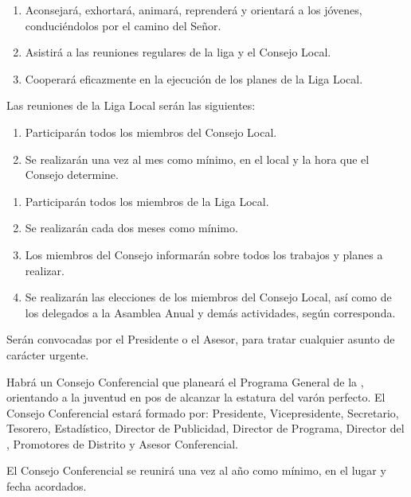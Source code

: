\begin{enumerate}
    \item Aconsejará, exhortará, animará, reprenderá y orientará a los jóvenes, conduciéndolos por el camino del Señor.
    \item Asistirá a las reuniones regulares de la liga y el Consejo Local.
    \item Cooperará eficazmente en la ejecución de los planes de la Liga Local.
\end{enumerate}

\article
\label{reuniones-locales}
Las reuniones de la Liga Local serán las siguientes:

\begin{enumerate}
    \item Participarán todos los miembros del Consejo Local.
    \item Se realizarán una vez al mes como mínimo, en el local y la hora que el Consejo determine.
\end{enumerate}

\begin{enumerate}
    \item Participarán todos los miembros de la Liga Local.
    \item Se realizarán cada dos meses como mínimo.
    \item Los miembros del Consejo informarán sobre todos los trabajos y planes a realizar.
    \item Se realizarán las elecciones de los miembros del Consejo Local, así como de los delegados a la Asamblea Anual y demás actividades, según corresponda.
\end{enumerate}

Serán convocadas por el Presidente o el Asesor, para tratar cualquier asunto de carácter urgente.


\article
Habrá un Consejo Conferencial que planeará el Programa General de la \LMJ{}, orientando a la juventud en pos de alcanzar la estatura del varón perfecto. El Consejo Conferencial estará formado por: Presidente, Vicepresidente, Secretario, Tesorero, Estadístico, Director de Publicidad, Director de Programa, Director del \OOLMJ{}, Promotores de Distrito y Asesor Conferencial.

\article
\label{reunion-consejo-conferencial}
El Consejo Conferencial se reunirá una vez al año como mínimo, en el lugar y fecha acordados.

